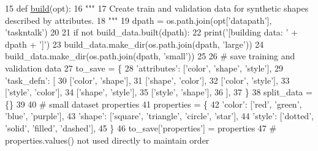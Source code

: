 \begin{DoxyCode}
15 \textcolor{keyword}{def }\hyperlink{namespacedialog__babi__feedback_1_1build_a7a9d289f7493a5ded13c4b7f071b6184}{build}(opt):
16     \textcolor{stringliteral}{"""}
17 \textcolor{stringliteral}{    Create train and validation data for synthetic shapes described by attributes.}
18 \textcolor{stringliteral}{    """}
19     dpath = os.path.join(opt[\textcolor{stringliteral}{'datapath'}], \textcolor{stringliteral}{'taskntalk'})
20 
21     \textcolor{keywordflow}{if} \textcolor{keywordflow}{not} build\_data.built(dpath):
22         print(\textcolor{stringliteral}{'[building data: '} + dpath + \textcolor{stringliteral}{']'})
23         build\_data.make\_dir(os.path.join(dpath, \textcolor{stringliteral}{'large'}))
24         build\_data.make\_dir(os.path.join(dpath, \textcolor{stringliteral}{'small'}))
25 
26         \textcolor{comment}{# save training and validation data}
27         to\_save = \{
28             \textcolor{stringliteral}{'attributes'}: [\textcolor{stringliteral}{'color'}, \textcolor{stringliteral}{'shape'}, \textcolor{stringliteral}{'style'}],
29             \textcolor{stringliteral}{'task\_defn'}: [
30                 [\textcolor{stringliteral}{'color'}, \textcolor{stringliteral}{'shape'}],
31                 [\textcolor{stringliteral}{'shape'}, \textcolor{stringliteral}{'color'}],
32                 [\textcolor{stringliteral}{'color'}, \textcolor{stringliteral}{'style'}],
33                 [\textcolor{stringliteral}{'style'}, \textcolor{stringliteral}{'color'}],
34                 [\textcolor{stringliteral}{'shape'}, \textcolor{stringliteral}{'style'}],
35                 [\textcolor{stringliteral}{'style'}, \textcolor{stringliteral}{'shape'}],
36             ],
37         \}
38         split\_data = \{\}
39 
40         \textcolor{comment}{# small dataset properties}
41         properties = \{
42             \textcolor{stringliteral}{'color'}: [\textcolor{stringliteral}{'red'}, \textcolor{stringliteral}{'green'}, \textcolor{stringliteral}{'blue'}, \textcolor{stringliteral}{'purple'}],
43             \textcolor{stringliteral}{'shape'}: [\textcolor{stringliteral}{'square'}, \textcolor{stringliteral}{'triangle'}, \textcolor{stringliteral}{'circle'}, \textcolor{stringliteral}{'star'}],
44             \textcolor{stringliteral}{'style'}: [\textcolor{stringliteral}{'dotted'}, \textcolor{stringliteral}{'solid'}, \textcolor{stringliteral}{'filled'}, \textcolor{stringliteral}{'dashed'}],
45         \}
46         to\_save[\textcolor{stringliteral}{'properties'}] = properties
47         \textcolor{comment}{# properties.values() not used directly to maintain order}

\end{DoxyCode}
